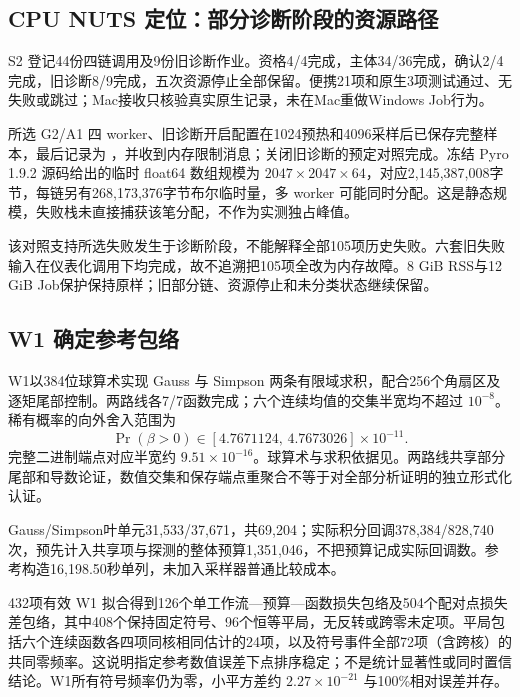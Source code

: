 \documentclass[UTF8,zihao=-4,a4paper,fontset=fandol]{ctexart}
\begin{document}
\subsection{CPU NUTS 定位：部分诊断阶段的资源路径}
S2 登记44份四链调用及9份旧诊断作业。资格4/4完成，主体34/36完成，确认2/4完成，旧诊断8/9完成，五次资源停止全部保留。便携21项和原生3项测试通过、无失败或跳过；Mac接收只核验真实原生记录，未在Mac重做Windows Job行为。

所选 G2/A1 四 worker、旧诊断开启配置在1024预热和4096采样后已保存完整样本，最后记录为 ，并收到内存限制消息；关闭旧诊断的预定对照完成。冻结 Pyro 1.9.2 源码给出的临时 float64 数组规模为 $2047\times2047\times64$，对应2,145,387,008字节，每链另有268,173,376字节布尔临时量，多 worker 可能同时分配。这是静态规模，失败栈未直接捕获该笔分配，不作为实测独占峰值。

该对照支持所选失败发生于诊断阶段，不能解释全部105项历史失败。六套旧失败输入在仪表化调用下均完成，故不追溯把105项全改为内存故障。8 GiB RSS与12 GiB Job保护保持原样；旧部分链、资源停止和未分类状态继续保留。

\subsection{W1 确定参考包络}
W1以384位球算术实现 Gauss 与 Simpson 两条有限域求积，配合256个角扇区及逐矩尾部控制。两路线各7/7函数完成；六个连续均值的交集半宽均不超过 $10^{-8}$。稀有概率的向外舍入范围为
\begin{equation}
\Pr(\beta>0)\in[4.7671124,\,4.7673026]\times10^{-11}.
\end{equation}
完整二进制端点对应半宽约 $9.51\times10^{-16}$。球算术与求积依据见\cite{arb,dlmfquadrature}。两路线共享部分尾部和导数论证，数值交集和保存端点重聚合不等于对全部分析证明的独立形式化认证。

Gauss/Simpson叶单元31,533/37,671，共69,204；实际积分回调378,384/828,740次，预先计入共享项与探测的整体预算1,351,046，不把预算记成实际回调数。参考构造16,198.50秒单列，未加入采样器普通比较成本。

432项有效 W1 拟合得到126个单工作流—预算—函数损失包络及504个配对点损失差包络，其中408个保持固定符号、96个恒等平局，无反转或跨零未定项。平局包括六个连续函数各四项同核相同估计的24项，以及符号事件全部72项（含跨核）的共同零频率。这说明指定参考数值误差下点排序稳定；不是统计显著性或同时置信结论。W1所有符号频率仍为零，小平方差约 $2.27\times10^{-21}$ 与100\%相对误差并存。
\end{document}
